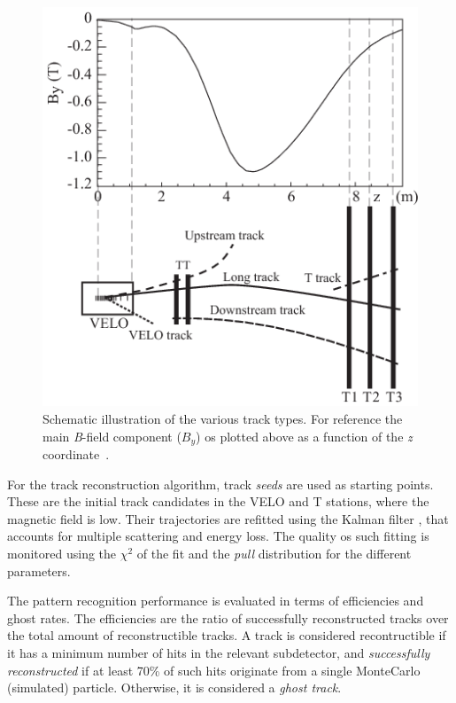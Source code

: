 \begin{figure} [htb!]
\begin{center}
\includegraphics[scale=0.6]{figs/TrackTypes.png}
\caption{Schematic illustration of the various track types. For reference the main \textit{B}-field component ($B_y$) os plotted above as a function of the \textit{z} coordinate~\cite{Aaij:2014jba}.\label{fig:lhcb_Tracks}}
\end{center}
\end{figure}

For the track reconstruction algorithm, track \textit{seeds} are used as starting points. These are the initial track candidates in the VELO and T stations, where the magnetic field is low. Their trajectories are refitted using the Kalman filter , that accounts for multiple scattering and energy loss. The quality os such fitting is monitored using the $\chi^2$ of the fit and the \textit{pull} distribution for the different parameters. 

The pattern recognition performance is evaluated in terms of efficiencies and ghost rates. The efficiencies are the ratio of successfully reconstructed tracks over the total amount of reconstructible tracks. A track is considered recontructible if it has a minimum number of hits in the relevant subdetector, and \textit{successfully reconstructed} if at least 70\% of such hits originate from a single MonteCarlo (simulated) particle. Otherwise, it is considered a \textit{ghost track}. 

